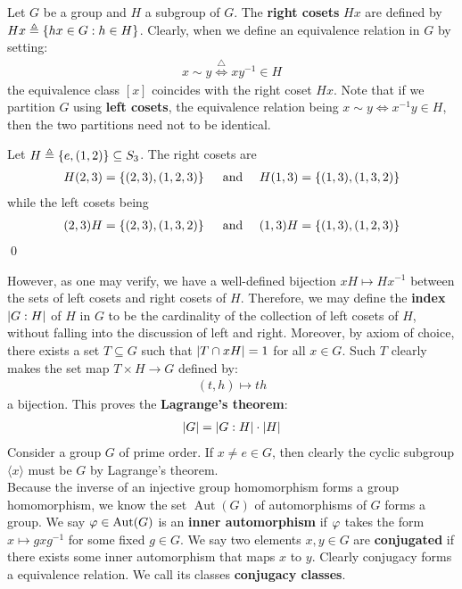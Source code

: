 \documentclass{report}
\begin{document}
Let $G$ be a group and $H$ a subgroup of $G$. The \textbf{right cosets} $Hx$ are defined by $Hx\triangleq \left\{ hx \in G: h \in H \right\}$. Clearly, when we define an equivalence relation in $G$ by setting: 
\begin{align*}
x\sim  y \overset{\triangle}{\iff } xy^{-1} \in H
\end{align*}
the equivalence class $[x]$ coincides with the right coset $Hx$. Note that if we partition $G$ using \textbf{left cosets}, the equivalence relation being $x\sim  y \iff  x^{-1}y\in H$, then the two partitions need not to be identical. 
\begin{example}
Let $H\triangleq \left\{ e,(1,2) \right\}\subseteq S_3$. The right cosets are 
\begin{align*}
H(2,3)=\left\{ (2,3),(1,2,3) \right\}\quad \text{ and }\quad  H(1,3)=\left\{ (1,3),(1,3,2) \right\}
\end{align*}
while the left cosets being
\begin{align*}
(2,3)H= \left\{ (2,3),(1,3,2) \right\} \quad \text{ and }\quad (1,3)H= \left\{ (1,3),(1,2,3) \right\}
\end{align*}
\qed
\end{example}
However, as one may verify, we have a well-defined bijection $xH\mapsto Hx^{-1}$ between the sets of left cosets and right cosets of $H$. Therefore, we may define the \textbf{index} $\left|G:H\right|$ of $H$ in  $G$ to be the cardinality of the collection of left cosets of $H$, without falling into the discussion of left and right. Moreover, by axiom of choice, there exists a set $T\subseteq G$ such that $\left|T\cap xH\right|=1$ for all $x \in G$. Such $T$ clearly makes the set map  $T \times H \rightarrow G$ defined by: 
\begin{align*}
  (t,h)\mapsto th
\end{align*}
a bijection. This proves the \textbf{Lagrange's theorem}: 
\begin{align*}
\left|G\right|= \left|G:H\right| \cdot \left|H\right|
\end{align*}
Consider a group $G$ of prime order. If $x \neq e\in G$, then clearly the cyclic subgroup $\langle x\rangle $ must be $G$ by Lagrange's theorem.  \\



Because the inverse of an injective group homomorphism forms a group homomorphism, we know the set $\operatorname{Aut}(G)$ of automorphisms of $G$ forms a group. We say $\pfi \in \operatorname{Aut}(G)$ is an \textbf{inner automorphism} if  $\pfi $ takes the form $x\mapsto  gxg^{-1}$ for some fixed $g \in G$. We say two elements  $x,y \in G$ are \textbf{conjugated} if there exists some inner automorphism that maps $x$ to $y$. Clearly conjugacy forms a equivalence relation. We call its classes \textbf{conjugacy classes}. 
\end{document}
